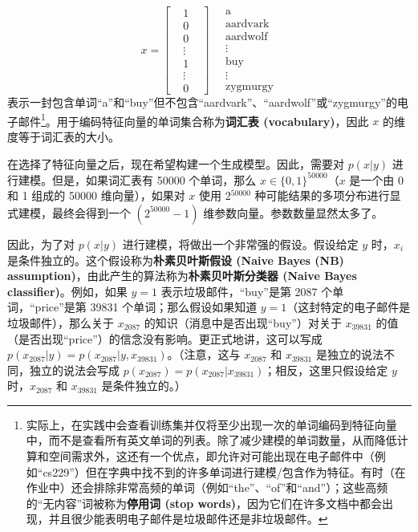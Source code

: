 \[
x = 
\begin{bmatrix}
    &1& \\
    &0& \\
    &0& \\
    &\vdots& \\
    &1& \\
    &\vdots& \\
    &0&
\end{bmatrix}
\quad %
\begin{array}{l}
    \text{a} \\
    \text{aardvark} \\
    \text{aardwolf} \\
    \vdots \\
    \text{buy} \\
    \vdots \\
    \text{zygmurgy}
\end{array}
\]
表示一封包含单词“a”和“buy”但不包含“aardvark”、“aardwolf”或“zygmurgy”的电子邮件\footnote{实际上，在实践中会查看训练集并仅将至少出现一次的单词编码到特征向量中，而不是查看所有英文单词的列表。除了减少建模的单词数量，从而降低计算和空间需求外，这还有一个优点，即允许对可能出现在电子邮件中（例如“cs229”）但在字典中找不到的许多单词进行建模/包含作为特征。有时（在作业中）还会排除非常高频的单词（例如“the”、“of”和“and”）；这些高频的“无内容”词被称为\textbf{停用词 (stop words)}，因为它们在许多文档中都会出现，并且很少能表明电子邮件是垃圾邮件还是非垃圾邮件。}。用于编码特征向量的单词集合称为\textbf{词汇表 (vocabulary)}，因此 $x$ 的维度等于词汇表的大小。

在选择了特征向量之后，现在希望构建一个生成模型。因此，需要对 $p(x|y)$ 进行建模。但是，如果词汇表有 50000 个单词，那么 $x \in \{0, 1\}^{50000}$（$x$ 是一个由 0 和 1 组成的 50000 维向量），如果对 $x$ 使用 2$^{50000}$ 种可能结果的多项分布进行显式建模，最终会得到一个 $(2^{50000}-1)$ 维参数向量。参数数量显然太多了。

因此，为了对 $p(x|y)$ 进行建模，将做出一个非常强的假设。假设给定 $y$ 时，$x_i$ 是条件独立的。这个假设称为\textbf{朴素贝叶斯假设 (Naive Bayes (NB) assumption)}，由此产生的算法称为\textbf{朴素贝叶斯分类器 (Naive Bayes classifier)}。例如，如果 $y=1$ 表示垃圾邮件，“buy”是第 2087 个单词，“price”是第 39831 个单词；那么假设如果知道 $y=1$（这封特定的电子邮件是垃圾邮件），那么关于 $x_{2087}$ 的知识（消息中是否出现“buy”）对关于 $x_{39831}$ 的值（是否出现“price”）的信念没有影响。更正式地讲，这可以写成 $p(x_{2087}|y) = p(x_{2087}|y, x_{39831})$。（注意，这与 $x_{2087}$ 和 $x_{39831}$ 是独立的说法不同，独立的说法会写成 $p(x_{2087}) = p(x_{2087}|x_{39831})$；相反，这里只假设给定 $y$ 时，$x_{2087}$ 和 $x_{39831}$ 是条件独立的。）

